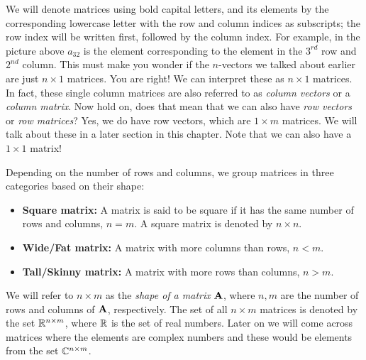 We will denote matrices using bold capital letters, and its elements by the corresponding lowercase letter with the row and column indices as subscripts; the row index will be written first, followed by the column index. For example, in the picture above $a_{32}$ is the element corresponding to the element in the $3^{rd}$ row and $2^{nd}$ column. This must make you wonder if the $n$-vectors we talked about earlier are just $n \times 1$ matrices. You are right! We can interpret these as $n \times 1$ matrices. In fact, these single column matrices are also referred to as \textit{column vectors} or a \textit{column matrix}. Now hold on, does that mean that we can also have \textit{row vectors} or \textit{row matrices}? Yes, we do have row vectors, which are $1 \times m$ matrices. We will talk about these in a later section in this chapter. Note that we can also have a $1 \times 1$ matrix!

Depending on the number of rows and columns, we group matrices in three categories based on their shape:
\begin{itemize}
    \item \textbf{Square matrix:} A matrix is said to be square if it has the same number of rows and columns, $n = m$. A square matrix is denoted by $n \times n$.
    \item \textbf{Wide/Fat matrix:} A matrix with more columns than rows, $n < m$.
    \item \textbf{Tall/Skinny matrix:} A matrix with more rows than columns, $n > m$.
\end{itemize}
We will refer to $n \times m$ as the \textit{shape of a matrix} $\mathbf{A}$, where $n, m$ are the number of rows and columns of $\mathbf{A}$, respectively. The set of all $n \times m$ matrices is denoted by the set $\mathbb{R}^{n \times m}$, where $\mathbb{R}$ is the set of real numbers. Later on we will come across matrices where the elements are complex numbers and these would be elements from the set $\mathbb{C}^{n \times m}$.

